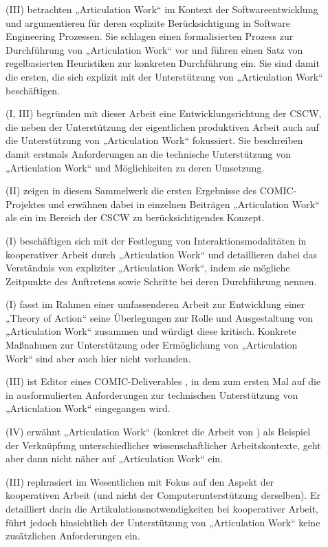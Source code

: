 \begin{description}
	\item[\citet{Mi91}] (III) betrachten „Articulation Work“ im Kontext der Softwareentwicklung und argumentieren für deren explizite Berücksichtigung in Software Engineering Prozessen. Sie schlagen einen formalisierten Prozess zur Durchführung von „Articulation Work“ vor und führen einen Satz von regelbasierten Heuristiken zur konkreten Durchführung ein. Sie sind damit die ersten, die sich explizit mit der Unterstützung von „Articulation Work“ beschäftigen.
	\item[\citet{Schmidt92}] (I, III) begründen mit dieser Arbeit eine Entwicklungsrichtung der \gls{CSCW}, die neben der Unterstützung der eigentlichen produktiven Arbeit auch auf die Unterstützung von „Articulation Work“ fokussiert. Sie beschreiben damit erstmals Anforderungen an die technische Unterstützung von „Articulation Work“ und Möglichkeiten zu deren Umsetzung.
	\item[\citet{Bannon93}] (II) zeigen in diesem Sammelwerk die ersten Ergebnisse des COMIC-Projektes \citep{Rodden95} und erwähnen dabei in einzelnen Beiträgen „Articulation Work“ als ein im Bereich der \gls{CSCW} zu berücksichtigendes Konzept.
	\item[\citet{Corbin93}] (I) beschäftigen sich mit der Festlegung von Interaktionsmodalitäten in kooperativer Arbeit durch „Articulation Work“ und detaillieren dabei das Verständnis von expliziter „Articulation Work“, indem sie mögliche Zeitpunkte des Auftretens sowie Schritte bei deren Durchführung nennen.
	\item[\citet{Strauss93}] (I) fasst im Rahmen einer umfassenderen Arbeit zur Entwicklung einer „Theory of Action“ seine Überlegungen zur Rolle und Ausgestaltung von „Articulation Work“ zusammen und würdigt diese kritisch. Konkrete Maßnahmen zur Unterstützung oder Ermöglichung von „Articulation Work“ sind aber auch hier nicht vorhanden.
	\item[\citet{Bowers94}] (III) ist Editor eines COMIC-Deliverables \citep{Rodden95}, in dem zum ersten Mal auf die in \citep{Schmidt96} ausformulierten Anforderungen zur technischen Unterstützung von „Articulation Work“ eingegangen wird.
	\item[\citet{Lenoir94}] (IV) erwähnt „Articulation Work“ (konkret die Arbeit von \citet{Fujimura87}) als Beispiel der Verknüpfung unterschiedlicher wissenschaftlicher Arbeitskontexte, geht aber dann nicht näher auf „Articulation Work“ ein.
	\item[\citet{Schmidt94}] (III) rephrasiert im Wesentlichen \citep{Schmidt90} mit Fokus auf den Aspekt der kooperativen Arbeit (und nicht der Computerunterstützung derselben). Er detailliert darin die Artikulationsnotwendigkeiten bei kooperativer Arbeit, führt jedoch hinsichtlich der Unterstützung von „Articulation Work“ keine zusätzlichen Anforderungen ein.

\end{description}
